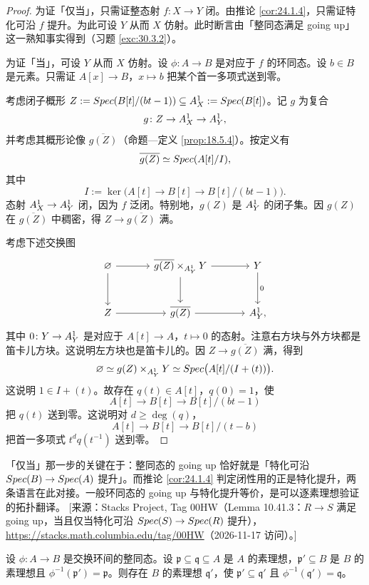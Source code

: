\begin{proof}
为证「仅当」，只需证整态射 $f\colon X\to Y$ 闭。由推论 \ref{cor:24.1.4}，只需证特化可沿 $f$ 提升。为此可设 $Y$ 从而 $X$ 仿射。此时断言由「整同态满足 going up」这一熟知事实得到（习题 \ref{exc:30.3.2}）。

为证「当」，可设 $Y$ 从而 $X$ 仿射。设 $\phi\colon A\to B$ 是对应于 $f$ 的环同态。设 $b\in B$ 是元素。只需证 $A[x]\to B$，$x\mapsto b$ 把某个首一多项式送到零。

考虑闭子概形 $Z:=Spec(B[t]/(bt-1))\subseteq A^1_X:=Spec(B[t])$。记 $g$ 为复合
\[
g\colon Z\to A^1_X\to A^1_Y,
\]
并考虑其概形论像 $\overline{g(Z)}$（命题—定义 \ref{prop:18.5.4}）。按定义有
\[
\overline{g(Z)}\simeq Spec(A[t]/I),
\]
其中
\[
I:=\ker\bigl(A[t]\to B[t]\to B[t]/(bt-1)\bigr).
\]
态射 $A^1_X\to A^1_Y$ 闭，因为 $f$ 泛闭。特别地，$g(Z)$ 是 $A^1_Y$ 的闭子集。因 $g(Z)$ 在 $\overline{g(Z)}$ 中稠密，得 $Z\to\overline{g(Z)}$ 满。

考虑下述交换图
\[
\begin{tikzcd}[column sep=3.4em, row sep=2.6em]
\varnothing \arrow[r] \arrow[d] & \overline{g(Z)}\times_{\A^1_Y}Y \arrow[r] \arrow[d] & Y \arrow[d, "0"] \\
Z \arrow[r] & \overline{g(Z)} \arrow[r] & \A^1_Y,
\end{tikzcd}
\]
其中 $0\colon Y\to A^1_Y$ 是对应于 $A[t]\to A$，$t\mapsto 0$ 的态射。注意右方块与外方块都是笛卡儿方块。这说明左方块也是笛卡儿的。因 $Z\to\overline{g(Z)}$ 满，得到
\[
\varnothing\simeq g(Z)\times_{A^1_Y}Y\simeq Spec\bigl(A[t]/(I+(t))\bigr).
\]
这说明 $1\in I+(t)$。故存在 $q(t)\in A[t]$，$q(0)=1$，使
\[
A[t]\to B[t]\to B[t]/(bt-1)
\]
把 $q(t)$ 送到零。这说明对 $d\ge\deg(q)$，
\[
A[t]\to B[t]\to B[t]/(t-b)
\]
把首一多项式 $t^dq(t^{-1})$ 送到零。
\end{proof}

\begin{yizhu}
「仅当」那一步的关键在于：整同态的 going up 恰好就是「特化可沿 $Spec(B)\to Spec(A)$ 提升」。而推论 \ref{cor:24.1.4} 判定闭性用的正是特化提升，两条语言在此对接。一般环同态的 going up 与特化提升等价，是可以逐素理想验证的拓扑翻译。
[来源：Stacks Project, Tag 00HW（Lemma 10.41.3：$R\to S$ 满足 going up，当且仅当特化可沿 $Spec(S)\to Spec(R)$ 提升），\url{https://stacks.math.columbia.edu/tag/00HW}（2026-11-17 访问）。]
\end{yizhu}

\begin{exercise}\label{exc:30.3.2}
设 $\phi\colon A\to B$ 是交换环间的整同态。设 $\mathfrak p\subseteq\mathfrak q\subseteq A$ 是 $A$ 的素理想，$\mathfrak p'\subseteq B$ 是 $B$ 的素理想且 $\phi^{-1}(\mathfrak p')=\mathfrak p$。则存在 $B$ 的素理想 $\mathfrak q'$，使 $\mathfrak p'\subseteq\mathfrak q'$ 且 $\phi^{-1}(\mathfrak q')=\mathfrak q$。
\end{exercise}

